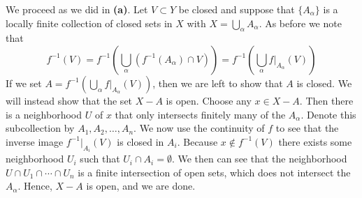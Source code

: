 \documentclass{article}
\newcommand{\problempart}[1]{\noindent{\textbf{(#1)}}}
\begin{document}
\problempart{c} We proceed as we did in {\bf (a)}. Let $V \subset Y$ be closed and suppose that $\{A_\alpha\}$ is a locally finite collection of closed sets in $X$ with $X = \bigcup_\alpha A_\alpha$. As before we note that 
\[
f^{-1}(V) = f^{-1}\left(\bigcup_\alpha (f^{-1}(A_\alpha) \cap V)\right) = f^{-1}\left(\bigcup_\alpha f|_{A_\alpha}(V)\right) 
\]
If we set $A = f^{-1}\left(\bigcup_\alpha f|_{A_\alpha}(V)\right) $, then we are left to show that $A$ is closed. We will instead show that the set $X - A$ is open. Choose any $x \in X-A$. Then there is a neighborhood $U$ of $x$ that only intersects finitely many of the $A_\alpha$. Denote this subcollection by $A_1, A_2, \ldots, A_n$. We now use the continuity of $f$ to see that the inverse image $f^{-1}|_{A_i}(V)$ is closed in $A_i$. Because $x \not\in f^{-1}(V)$ there exists some neighborhood $U_i$ such that $U_i \cap A_i = \emptyset$. We then can see that the neighborhood $U \cap U_1 \cap \cdots \cap U_n$ is a finite intersection of open sets, which does not intersect the $A_\alpha$. Hence, $X-A$ is open, and we are done.  
\end{document}
